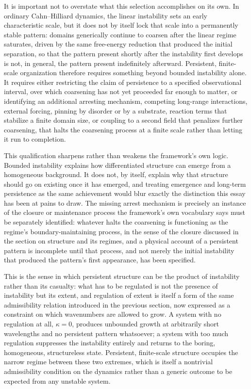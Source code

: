 \documentclass[11pt]{article}
\begin{document}
It is important not to overstate what this selection accomplishes on its own. In ordinary Cahn--Hilliard dynamics, the linear instability sets an early characteristic scale, but it does not by itself lock that scale into a permanently stable pattern: domains generically continue to coarsen after the linear regime saturates, driven by the same free-energy reduction that produced the initial separation, so that the pattern present shortly after the instability first develops is not, in general, the pattern present indefinitely afterward. Persistent, finite-scale organization therefore requires something beyond bounded instability alone. It requires either restricting the claim of persistence to a specified observational interval, over which coarsening has not yet proceeded far enough to matter, or identifying an additional arresting mechanism, competing long-range interactions, external forcing, pinning by disorder or by a substrate, reaction terms that stabilize a finite domain size, or coupling to a second field that penalizes further coarsening, that halts the coarsening process at a finite scale rather than letting it run to completion.

This qualification sharpens rather than weakens the framework's own logic. Bounded instability explains how differentiated structure can emerge from a homogeneous background. It does not, by itself, explain why that structure should go on existing once it has emerged, and treating emergence and long-term persistence as the same achievement would blur exactly the distinction this essay has been at pains to draw. The missing arrest mechanism is precisely an instance of the closure or maintenance process the framework's own vocabulary says must be separately identified: whatever halts the coarsening is functioning as the regime's boundary-maintaining process, in the sense of the closure discussed in the section on structure and its regimes, and a physical account of a persistent pattern is incomplete until that process, and not merely the initial instability that produced the pattern's first appearance, has been specified.

This is the sense in which persistent structure can be the product of instability rather than its casualty: what has to be regulated is not the presence of instability but its extent, and regulation of extent is itself a form of the same admissibility relation introduced in the previous section, now expressed as a constraint on which wavenumbers are allowed to grow. A system with no regulation at all, $\kappa = 0$, produces unbounded growth at arbitrarily short wavelengths and no persistent pattern whatsoever; a system with too much regulation suppresses the instability entirely and returns to the boring, homogeneous, structureless state. Persistent, finite-scale structure occupies the narrow regime between these two extremes, which is itself a nontrivial admissibility condition on the dynamics rather than a generic outcome to be expected from any unstable system.
\end{document}
